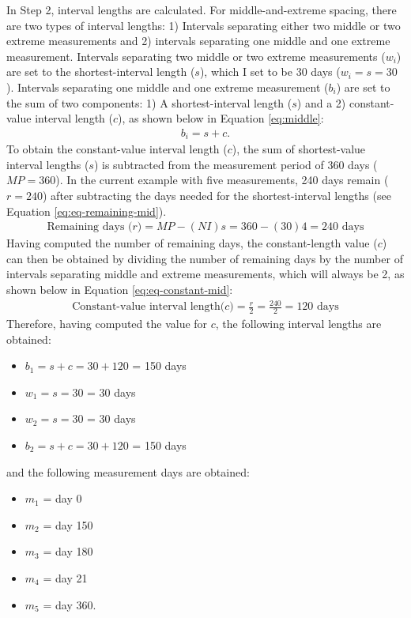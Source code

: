 \documentclass[
12pt, %
twoside,
english]{guelphthesis}
\begin{document}
In Step 2, interval lengths are calculated. For middle-and-extreme spacing, there are two types of interval lengths: 1) Intervals separating either two middle or two extreme measurements and 2) intervals separating one middle and one extreme measurement. Intervals separating two middle or two extreme measurements (\(w_i\)) are set to the shortest-interval length (\(s\)), which I set to be 30 days (\(w_i = s = 30\)). Intervals separating one middle and one extreme measurement (\(b_i\)) are set to the sum of two components: 1) A shortest-interval length (\(s\)) and a 2) constant-value interval length (\(c\)), as shown below in Equation \ref{eq:middle}:
\begin{align}
b_i = s + c.
  \label{eq:middle} 
\end{align}
\noindent To obtain the constant-value interval length (\(c\)), the sum of shortest-value interval lengths (\(s\)) is subtracted from the measurement period of 360 days (\(MP = 360\)). In the current example with five measurements, 240 days remain (\(r = 240\)) after subtracting the days needed for the shortest-interval lengths (see Equation \ref{eq:eq-remaining-mid}).
\begin{align}
\text{Remaining days (} \textit{r})  = MP - (NI)s = 360 - (30)4 = 240 \text{ days}
  \label{eq:eq-remaining-mid} 
\end{align}
\noindent Having computed the number of remaining days, the constant-length value (\(c\)) can then be obtained by dividing the number of remaining days by the number of intervals separating middle and extreme measurements, which will always be 2, as shown below in Equation \ref{eq:eq-constant-mid}:
\begin{align}
\text{Constant-value interval length(} \textit{c}\text{)} = \frac{r}{2} = \frac{240}{2} = \text{120 days}
  \label{eq:eq-constant-mid} 
\end{align}
\noindent Therefore, having computed the value for \(c\), the following interval lengths are obtained:
\begin{itemize}
\tightlist
\item
  \(b_{1} = s + c = 30 + 120\) = 150 days
\item
  \(w_{1} = s = 30\) = 30 days
\item
  \(w_{2} = s = 30\) = 30 days
\item
  \(b_{2} = s + c = 30 + 120\) = 150 days
\end{itemize}
\noindent and the following measurement days are obtained:
\begin{itemize}
\tightlist
\item
  \(m_1\) = day 0
\item
  \(m_2\) = day 150
\item
  \(m_3\) = day 180
\item
  \(m_4\) = day 21
\item
  \(m_5\) = day 360.
\end{itemize}
\end{document}
